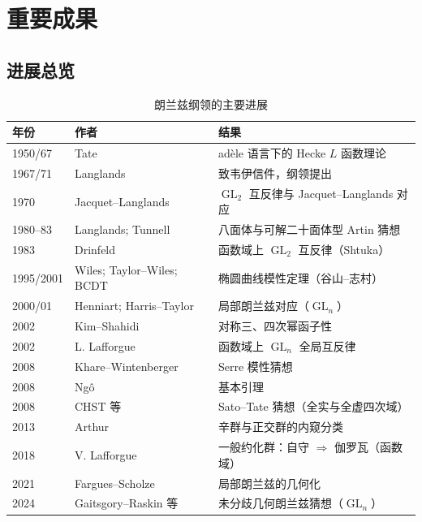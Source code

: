 \section{重要成果}\label{sec:results}

\subsection{进展总览}

\begin{table}[htbp]
    \centering
    \caption{朗兰兹纲领的主要进展}
    \label{tab:progress}
    \begin{tabular}{lll}
        \toprule
        年份 & 作者 & 结果 \\
        \midrule
        1950/67 & Tate & adèle 语言下的 Hecke $L$ 函数理论\cite{tate1967} \\
        1967/71 & Langlands & 致韦伊信件，纲领提出\cite{langlands1967,langlands1971} \\
        1970 & Jacquet--Langlands & $\operatorname{GL}_2$ 互反律与 Jacquet--Langlands 对应\cite{jacquet1970} \\
        1980--83 & Langlands; Tunnell & 八面体与可解二十面体型 Artin 猜想\cite{langlands1980,tunnell1981} \\
        1983 & Drinfeld & 函数域上 $\operatorname{GL}_2$ 互反律（Shtuka）\cite{drinfeld1983} \\
        1995/2001 & Wiles; Taylor--Wiles; BCDT & 椭圆曲线模性定理（谷山--志村）\cite{wiles1995modular,taylor1995ring,bcdt2001} \\
        2000/01 & Henniart; Harris--Taylor & 局部朗兰兹对应（$\operatorname{GL}_n$）\cite{harristaylor2001} \\
        2002 & Kim--Shahidi & 对称三、四次幂函子性\cite{kimshahidi2002} \\
        2002 & L. Lafforgue & 函数域上 $\operatorname{GL}_n$ 全局互反律\cite{lafforgue2002} \\
        2008 & Khare--Wintenberger & Serre 模性猜想\cite{khare2009} \\
        2008 & Ng\^o & 基本引理\cite{ngo2010} \\
        2008 & CHST 等 & Sato--Tate 猜想（全实与全虚四次域） \\
        2013 & Arthur & 辛群与正交群的内窥分类\cite{arthur2013} \\
        2018 & V. Lafforgue & 一般约化群：自守 $\Rightarrow$ 伽罗瓦（函数域）\cite{vlafforgue2018} \\
        2021 & Fargues--Scholze & 局部朗兰兹的几何化\cite{fargues2021} \\
        2024 & Gaitsgory--Raskin 等 & 未分歧几何朗兰兹猜想（$\operatorname{GL}_n$）\cite{gaitsgoryraskin2024} \\
        \bottomrule
    \end{tabular}
\end{table}

